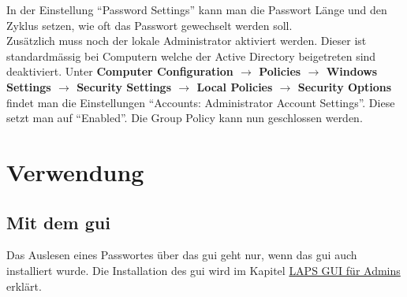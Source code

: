 In der Einstellung ``Password Settings'' kann man die Passwort Länge und den Zyklus setzen, wie oft das Passwort gewechselt werden soll.\\

Zusätzlich muss noch der lokale Administrator aktiviert werden.
Dieser ist standardmässig bei Computern welche der Active Directory beigetreten sind deaktiviert.
Unter \textbf{Computer Configuration $\rightarrow$ Policies $\rightarrow$ Windows Settings $\rightarrow$ Security Settings $\rightarrow$ Local Policies $\rightarrow$ Security Options } findet man die Einstellungen ``Accounts: Administrator Account Settings''.
Diese setzt man auf ``Enabled''.
Die Group Policy kann nun geschlossen werden.


\section{Verwendung}
\subsection{Mit dem \acrshort{gui}}\label{subsec:laps-gui-usage}
Das Auslesen eines Passwortes über das \acrshort{gui} geht nur, wenn das \acrshort{gui} auch installiert wurde.
Die Installation des \acrshort{gui} wird im Kapitel \hyperref[subsubsec:Laps-Gui]{LAPS GUI für Admins} erklärt.\\

